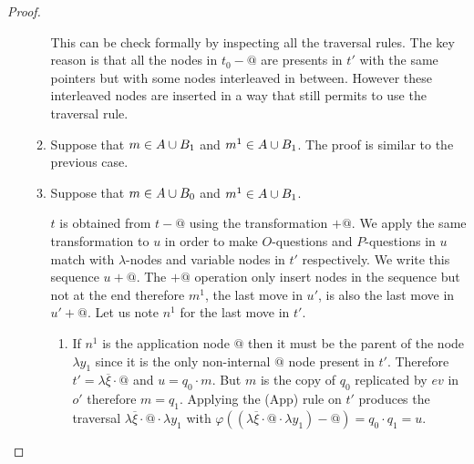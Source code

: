 \begin{proof}
\begin{itemize}
\begin{enumerate}
    This can be check formally by inspecting all the traversal rules. The key reason is that
    all the nodes in $t_0-@$ are presents in $t'$ with the same pointers but with some nodes interleaved in between.
    However these interleaved nodes are inserted in a way that still permits to use the traversal rule.

    \item Suppose that $m \in A \cup B_1$ and $m^1 \in A \cup B_1$.
    The proof is similar to the previous case.

    \item Suppose that $m \in A \cup B_0$ and $m^1 \in A \cup B_1$.

    $t$ is obtained from $t-@$ using the transformation $+@$. We apply the same transformation to $u$ in order
    to make $O$-questions and $P$-questions in $u$ match with $\lambda$-nodes and variable nodes in $t'$ respectively.
    We write this sequence $u+@$.
    The $+@$ operation only insert nodes in the sequence but not at the end
    therefore $m^1$, the last move in $u'$, is also the last move in $u'+@$.
    Let us note $n^1$ for the last move in $t'$.

        \begin{enumerate}
        \item If $n^1$ is the application node $@$ then it must be the parent of the node $\lambda y_1$ since it
        is the only non-internal $@$ node present in $t'$.
        Therefore $t'=\lambda \overline{\xi} \cdot @$ and $u= q_0 \cdot m$.
        But $m$ is the copy of $q_0$ replicated by $ev$ in $o'$ therefore $m=q_1$.
        Applying the (App) rule on $t'$ produces the traversal $\lambda \overline{\xi} \cdot @ \cdot \lambda y_1$
        with $\varphi((\lambda \overline{\xi} \cdot @ \cdot \lambda y_1)-@ ) = q_0 \cdot q_1 = u$.


\end{enumerate}
\end{enumerate}
\end{itemize}
\end{proof}
